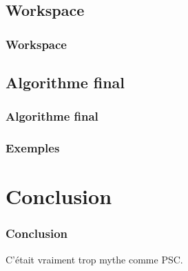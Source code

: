\documentclass[12pt, handout]{beamer}
\begin{document}
\subsection{Workspace}

\begin{frame}
 \frametitle{Workspace}
 
 
\end{frame}

\begin{frame}
 \frametitle{}
 
 
\end{frame}

\subsection{Algorithme final}

\begin{frame}
 \frametitle{Algorithme final}
 
 
\end{frame}

\begin{frame}
 \frametitle{Exemples}
 
 
\end{frame}

\section{Conclusion}

\begin{frame}
 \frametitle{Conclusion}
 
C'était vraiment trop mythe comme PSC.
 
\end{frame}
\end{document}
